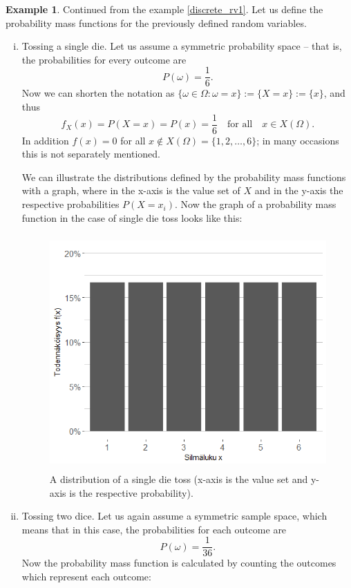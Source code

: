 \documentclass[12pt,a4paper,leqno]{report}
\theoremstyle{plain}
\theoremstyle{definition}
\newtheorem{esim}[equation]{Example}
\begin{document}
\begin{esim}
\label{discrete_rv2}
Continued from the example \ref{discrete_rv1}. Let us define the probability mass functions for the previously defined random variables.
\begin{enumerate}[(i)]
\item Tossing a single die. Let us assume a symmetric probability space -- that is, the probabilities for every outcome are 
\[
P(\omega) = \frac{1}{6}.
\]
Now we can shorten the notation as $\{\omega \in \Omega : \omega = x\} := \{X = x\} := \{x\}$, and thus
\[
f_X(x) = P(X=x) = P(x) = \frac{1}{6} \quad \text{for all} \quad x \in X(\Omega).
\]
In addition $f(x) = 0$ for all $x \notin X(\Omega) = \{1,2, \dots , 6\}$; in many occasions this is not separately mentioned.

We can illustrate the distributions defined by the probability mass functions with a graph, where in the x-axis is the value set of $X$ and in the y-axis the respective probabilities $P(X=x_i)$. Now the graph of a probability mass function in the case of single die toss looks like this:

\begin{figure}[!h]
\centering
\includegraphics[height = 9cm]{noppa.png}
\caption{A distribution of a single die toss (x-axis is the value set and y-axis is the respective probability).}
\end{figure}

\item Tossing two dice. Let us again assume a symmetric sample space, which means that in this case, the probabilities for each outcome are 
\[
P(\omega) = \frac{1}{36}.
\]
Now the probability mass function is calculated by counting the outcomes which represent each outcome:
\bigskip


\end{enumerate}
\end{esim}
\end{document}
